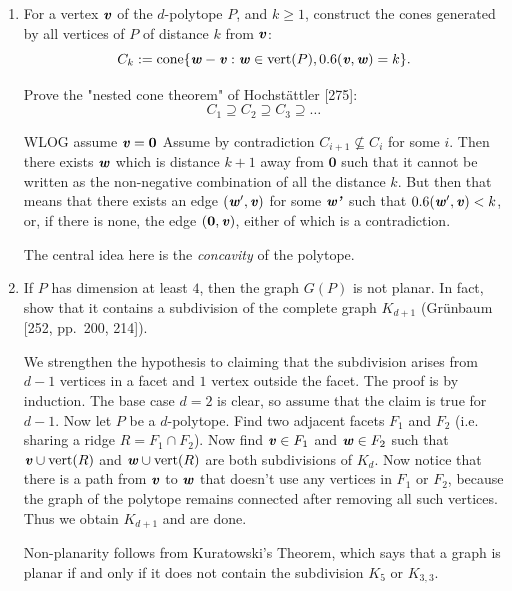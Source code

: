 \documentclass{article}
\begin{document}
\begin{enumerate}
\item For a vertex $\textbf{\textit{v}}$ of the $d$-polytope $P$, and $k \ge 1$, construct the cones generated by all vertices of $P$ of distance $k$ from $\textbf{\textit{v}}$:
\[C_k := \operatorname{cone}\{\textbf{\textit{w}}-\textbf{\textit{v}} : \textbf{\textit{w}} \in \operatorname{vert}(P), 0.6(\textbf{\textit{v}},\textbf{\textit{w}}) = k\}.\]

Prove the "nested cone theorem" of Hochstättler [275]:
\[C_1 \supseteq C_2 \supseteq C_3 \supseteq \ldots\]

\begin{solution}
    WLOG assume $\textbf{\textit{v}} = \textbf{0}$ Assume by contradiction $C_{i+1} \nsubseteq C_i$ for some $i$. Then there exists $\textbf{\textit{w}}$ which is distance $k+1$ away from $\textbf{0}$ such that it cannot be written as the non-negative combination of all the distance $k$. But then that means that there exists an edge $(\textbf{\textit{w}}', \textbf{\textit{v}})$ for some $\textbf{\textit{w'}}$ such that $0.6(\textbf{\textit{w}}', \textbf{\textit{v}}) < k$, or, if there is none, the edge $(\textbf{0}, \textbf{\textit{v}})$, either of which is a contradiction.

    \begin{remark}
        The central idea here is the \textit{concavity} of the polytope.
    \end{remark}
\end{solution}

\item If $P$ has dimension at least $4$, then the graph $G(P)$ is not planar. In fact, show that it contains a subdivision of the complete graph $K_{d+1}$ (Gr\"unbaum [252, pp.~200, 214]).

\begin{solution}
    We strengthen the hypothesis to claiming that the subdivision arises from $d-1$ vertices in a facet and $1$ vertex outside the facet. The proof is by induction. The base case $d=2$ is clear, so assume that the claim is true for $d-1$. Now let $P$ be a $d$-polytope. Find two adjacent facets $F_1$ and $F_2$ (i.e. sharing a ridge $R = F_1 \cap F_2$). Now find $\textbf{\textit{v}} \in F_1$ and $\textbf{\textit{w}} \in F_2$ such that $\textbf{\textit{v}} \cup \operatorname{vert}(R)$ and $\textbf{\textit{w}} \cup \operatorname{vert}(R)$ are both subdivisions of $K_d$. Now notice that there is a path from $\textbf{\textit{v}}$ to $\textbf{\textit{w}}$ that doesn't use any vertices in $F_1$ or $F_2$, because the graph of the polytope remains connected after removing all such vertices. Thus we obtain $K_{d+1}$ and are done.
    
    \begin{remark}
        Non-planarity follows from Kuratowski's Theorem, which says that a graph is planar if and only if it does not contain the subdivision $K_5$ or $K_{3,3}$.
    \end{remark}


\end{solution}
\end{enumerate}
\end{document}
